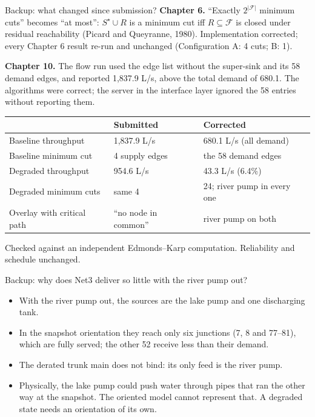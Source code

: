 \documentclass[aspectratio=169,11pt]{beamer}
\begin{document}
\begin{frame}{Backup: what changed since submission?}
\small
\textbf{Chapter 6.} ``Exactly $2^{|\mathcal{F}|}$ minimum cuts'' becomes ``at most'':
$S^\star\cup R$ is a minimum cut iff $R\subseteq\mathcal{F}$ is closed under residual
reachability (Picard and Queyranne, 1980). Implementation corrected; every Chapter 6 result
re-run and unchanged (Configuration A: 4 cuts; B: 1).

\medskip
\textbf{Chapter 10.} The flow run used the edge list without the super-sink and its 58 demand
edges, and reported 1,837.9 L/s, above the total demand of 680.1. The algorithms were correct;
the server in the interface layer ignored the 58 entries without reporting them.
\begin{center}
\begin{tabular}{@{}lll@{}}
\toprule
& Submitted & Corrected \\
\midrule
Baseline throughput & 1,837.9 L/s & 680.1 L/s (all demand) \\
Baseline minimum cut & 4 supply edges & the 58 demand edges \\
Degraded throughput & 954.6 L/s & 43.3 L/s (6.4\%) \\
Degraded minimum cuts & same 4 & 24; river pump in every one \\
Overlay with critical path & ``no node in common'' & river pump on both \\
\bottomrule
\end{tabular}
\end{center}
Checked against an independent Edmonds--Karp computation. Reliability and schedule unchanged.
\end{frame}

\begin{frame}{Backup: why does Net3 deliver so little with the river pump out?}
\small
\begin{itemize}
  \item With the river pump out, the sources are the lake pump and one discharging tank.
  \item In the snapshot orientation they reach only six junctions (7, 8 and 77--81), which are
  fully served; the other 52 receive less than their demand.
  \item The derated trunk main does not bind: its only feed is the river pump.
  \item Physically, the lake pump could push water through pipes that ran the other way at the
  snapshot. The oriented model cannot represent that. A degraded state needs an orientation of
  its own.
\end{itemize}
\end{frame}
\end{document}
